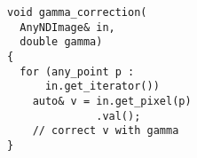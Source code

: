 \documentclass[varwidth=4cm,border={0.1cm 0.1cm 0.1cm 0.1cm}]{standalone}
\begin{document}
\begin{verbatim}
void gamma_correction(
  AnyNDImage& in,
  double gamma)
{
  for (any_point p :
      in.get_iterator())
    auto& v = in.get_pixel(p)
              .val();
    // correct v with gamma
}
\end{verbatim}
\end{document}
